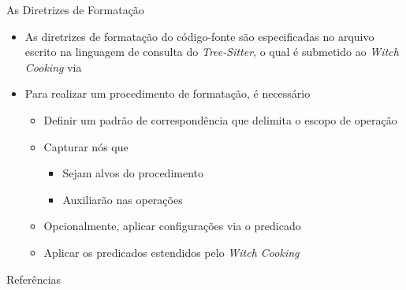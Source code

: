 \documentclass
  [ aspectratio=169,
    english,
    hyperref={citecolor=blue,colorlinks=true,linkcolor=blue,urlcolor=blue},
    brazil]
  {beamer}
\newcommand{\treesitter}{\textit{Tree-Sitter}\xspace}
\newcommand{\witchcooking}{\textit{Witch Cooking}\xspace}
\begin{document}


  \begin{frame}[fragile]{As Diretrizes de Formatação}
    \begin{itemize}
      \item As diretrizes de formatação do código-fonte são especificadas no
            arquivo escrito na linguagem de consulta do \treesitter, o qual é
            submetido ao \witchcooking via 
      \item Para realizar um procedimento de formatação, é necessário
            \begin{itemize}
              \item Definir um padrão de correspondência que delimita o escopo
                    de operação
              \item Capturar nós que
                    \begin{itemize}
                      \item Sejam alvos do procedimento
                      \item Auxiliarão nas operações
                    \end{itemize}
              \item Opcionalmente, aplicar configurações via o predicado
              \item Aplicar os predicados estendidos pelo \witchcooking
            \end{itemize}
    \end{itemize}
  \end{frame}


  \begin{frame}[allowframebreaks]{Referências}\printbibliography\end{frame}
\end{document}
